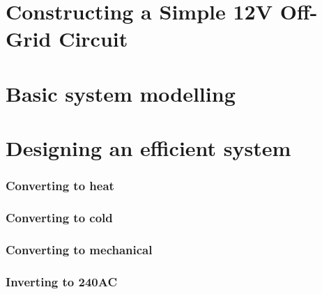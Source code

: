 \documentclass{article}
\theoremstyle{definition}
\theoremstyle{definition}
\theoremstyle{remark}
\begin{document}

\section{Constructing a Simple 12V Off-Grid Circuit} %
\label{sec:constructing_a_simple_12v_off_grid_circuit}

  \section{Basic system modelling} %
  \label{sec:basic_system_modelling}
  

  \section{Designing an efficient system} %
  \label{sec:designing_an_efficient_system}

    \subsubsection{Converting to heat} %
    \label{ssub:converting_to_heat}
    

    \subsubsection{Converting to cold} %
    \label{ssub:converting_to_cold}
    

    \subsubsection{Converting to mechanical} %
    \label{ssub:converting_to_mechanical}
    

    \subsubsection{Inverting to 240AC} %
    \label{ssub:inverting_to_240ac}
    
  
\end{document}

